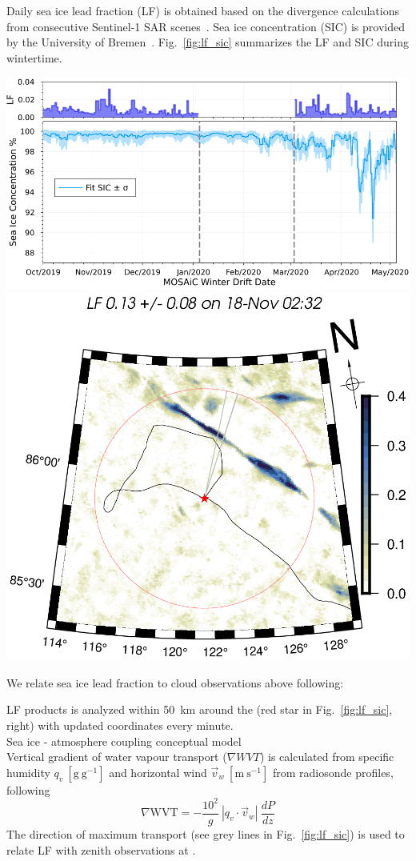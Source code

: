 \documentclass[landscape,a0paper,fontscale=0.45,margin=1cm]{baposter/baposter}
\begin{document}
\begin{poster}
{Daily sea ice lead fraction (LF) is obtained based on the divergence calculations from consecutive Sentinel-1 SAR scenes~. Sea ice concentration (SIC) is provided by the University of Bremen~. Fig.~\ref{fig:lf_sic} summarizes the LF and SIC during \mosaic wintertime.
\begin{minipage}{0.99\textwidth}
	\centering
		\includegraphics[width=.5\linewidth]{bias_sic_timeseries.png}\hspace{1cm}
		\includegraphics[width=.3\linewidth]{mosaic0152_20191115T03271573_20191118T05301574_LF.png}
	\captionsetup{width=0.8\linewidth}
	\label{fig:lf_sic}
\end{minipage}

We relate sea ice lead fraction to cloud observations above \polarstern following:

\colouredcircle LF products is analyzed within 50~km around the \polarstern (red star in Fig.~\ref{fig:lf_sic}, right) with updated coordinates every minute.\\

\colouredcircle Sea ice - atmosphere coupling conceptual model\\
Vertical gradient of water vapour transport ($\nabla WVT$) is calculated from specific humidity $q_v~\mathrm{[g~g^{-1}]}$ and horizontal wind $\vec{v}_w~\mathrm{[m~s^{-1}]}$ from radiosonde profiles, following
\begin{equation}
	\nabla \mathrm{WVT} = -\frac{10^2}{g}~|q_v\cdot \vec{v}_w|~\frac{dP}{dz}
\end{equation}
The direction of maximum transport (see grey lines in Fig.~\ref{fig:lf_sic}) is used to relate LF with zenith observations at \polarstern.

}
\end{poster}
\end{document}

